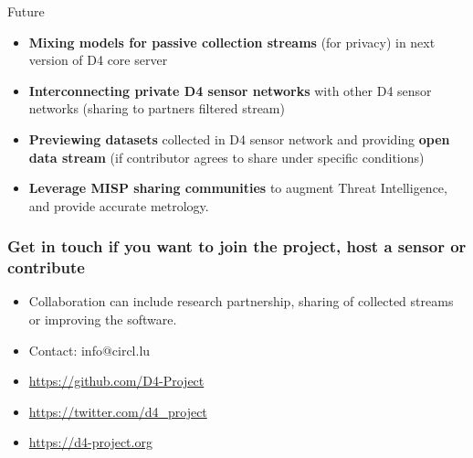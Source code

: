 \documentclass{beamer}
\begin{document}
\begin{frame}{Future}
     \begin{itemize}
     \item {\bf Mixing models for passive collection streams} (for privacy) in next version of D4 core server
     \item {\bf Interconnecting private D4 sensor networks} with other D4 sensor networks (sharing to partners filtered stream)
     \item {\bf Previewing datasets} collected in D4 sensor network and providing {\bf open data stream} (if contributor agrees to share under specific conditions)
     \item {\bf Leverage MISP sharing communities} to augment Threat
       Intelligence, and provide accurate metrology. 
\end{itemize}
\end{frame}

\begin{frame}
\frametitle{Get in touch if you want to join the project, host a sensor or contribute}
\begin{itemize}
\item Collaboration can include research partnership, sharing of collected streams or improving the software.
\item Contact: info@circl.lu
\item \url{https://github.com/D4-Project}
\item \url{https://twitter.com/d4_project}
\item \url{https://d4-project.org}
\end{itemize}
\end{frame}
\end{document}
